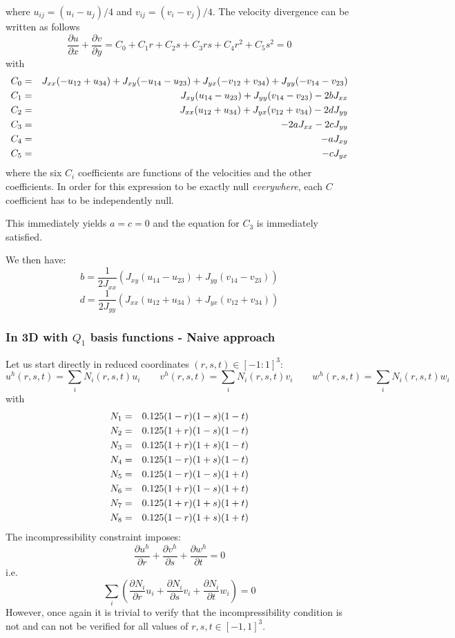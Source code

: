 where $u_{ij}=(u_i-u_j)/4$ and $v_{ij}=(v_i-v_j)/4$.
The velocity divergence can be written as follows
\[
\frac{\partial u}{\partial x} 
+\frac{\partial v}{\partial y} = C_0 +C_1 r + C_2 s + C_3 rs + C_4 r^2 + C_5 s^2 =0
\]
with
\begin{eqnarray}
C_0 &=& J_{xx} (-u_{12} + u_{34} ) + J_{xy} (- u_{14} - u_{23} )  + J_{yx}  (-v_{12} + v_{34}) + J_{yy} (-v_{14} - v_{23} )  \nonumber\\ 
C_1 &=& J_{xy} (u_{14} - u_{23}) + J_{yy} (v_{14} - v_{23}) - 2 b J_{xx}   \nonumber\\ 
C_2 &=& J_{xx} (u_{12} + u_{34}) + J_{yx} ( v_{12} + v_{34} )  - 2 d J_{yy}    \nonumber\\ 
C_3 &=& -2 a J_{xx}  -2 c J_{yy} \nonumber\\ 
C_4 &=& -a J_{xy}  \nonumber\\
C_5 &=& -c J_{yx}  \nonumber\\
\end{eqnarray}
where the six $C_i$ coefficients are functions of the velocities and the other coefficients.
In order for this expression to be exactly null {\it everywhere}, each $C$ coefficient has
to be independently null.

This immediately yields $a=c=0$ and the equation for $C_3$ is immediately satisfied.

We then have:
\[
b=\frac{1}{2J_{xx}} ( J_{xy} (u_{14} - u_{23}) + J_{yy} (v_{14} - v_{23})  ) 
\]
\[
d=\frac{1}{2J_{yy}} ( J_{xx} (u_{12} + u_{34}) + J_{yx} ( v_{12} + v_{34} ) ) 
\]






\subsubsection{In 3D with $Q_1$ basis functions - Naive approach}

Let us start directly in reduced coordinates $(r,s,t)\in [-1:1]^3$:
\[
u^h(r,s,t)=\sum_i N_i(r,s,t) u_i
\quad
\quad
v^h(r,s,t)=\sum_i N_i(r,s,t) v_i
\quad
\quad
w^h(r,s,t)=\sum_i N_i(r,s,t) w_i
\]
with
\begin{eqnarray}
N_1&=&0.125(1-r)(1-s)(1-t) \nonumber\\ 
N_2&=&0.125(1+r)(1-s)(1-t)  \nonumber\\ 
N_3&=&0.125(1+r)(1+s)(1-t)  \nonumber\\ 
N_4&=&0.125(1-r)(1+s)(1-t)  \nonumber\\ 
N_5&=&0.125(1-r)(1-s)(1+t)  \nonumber\\ 
N_6&=&0.125(1+r)(1-s)(1+t)  \nonumber\\ 
N_7&=&0.125(1+r)(1+s)(1+t)  \nonumber\\ 
N_8&=&0.125(1-r)(1+s)(1+t)  \nonumber
\end{eqnarray}
The incompressibility constraint imposes:
\[
\frac{\partial u^h}{\partial r}+
\frac{\partial v^h}{\partial s}+
\frac{\partial w^h}{\partial t}=0
\]
i.e.
\[
\sum_i \left(  
\frac{\partial N_i}{\partial r} u_i+
\frac{\partial N_i}{\partial s} v_i+
\frac{\partial N_i}{\partial t} w_i
\right)
=0
\]
However, once again it is trivial to verify that the incompressibility
condition is not and can not be verified for all values of
$r,s,t \in [-1,1]^3$.


